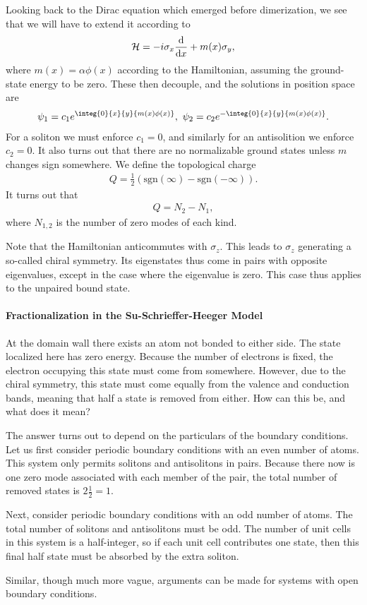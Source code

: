 Looking back to the Dirac equation which emerged before dimerization, we see that we will have to extend it according to
\begin{align*}
	\mathcal{H} = -i\sigma_{x}\dv{x} + m(x)\sigma_{y},
\end{align*}
where $m(x) = \alpha\phi(x)$ according to the Hamiltonian, assuming the ground-state energy to be zero. These then decouple, and the solutions in position space are
\begin{align*}
	\psi_{1} = c_{1}e^{\integ{0}{x}{y}{m(x)\phi(x)}},\ \psi_{2} = c_{2}e^{-\integ{0}{x}{y}{m(x)\phi(x)}}.
\end{align*}
For a soliton we must enforce $c_{1} = 0$, and similarly for an antisolition we enforce $c_{2} = 0$. It also turns out that there are no normalizable ground states unless $m$ changes sign somewhere. We define the topological charge
\begin{align*}
	Q = \frac{1}{2}\left(\text{sgn}(\infty) - \text{sgn}(-\infty)\right).
\end{align*}
It turns out that
\begin{align*}
	Q = N_{2} - N_{1},
\end{align*}
where $N_{1, 2}$ is the number of zero modes of each kind.

Note that the Hamiltonian anticommutes with $\sigma_{z}$. This leads to $\sigma_{z}$ generating a so-called chiral symmetry. Its eigenstates thus come in pairs with opposite eigenvalues, except in the case where the eigenvalue is zero. This case thus applies to the unpaired bound state.

\paragraph{Fractionalization in the Su-Schrieffer-Heeger Model}
At the domain wall there exists an atom not bonded to either side. The state localized here has zero energy. Because the number of electrons is fixed, the electron occupying this state must come from somewhere. However, due to the chiral symmetry, this state must come equally from the valence and conduction bands, meaning that half a state is removed from either. How can this be, and what does it mean?

The answer turns out to depend on the particulars of the boundary conditions. Let us first consider periodic boundary conditions with an even number of atoms. This system only permits solitons and antisolitons in pairs. Because there now is one zero mode associated with each member of the pair, the total number of removed states is $2\frac{1}{2} = 1$.

Next, consider periodic boundary conditions with an odd number of atoms. The total number of solitons and antisolitons must be odd. The number of unit cells in this system is a half-integer, so if each unit cell contributes one state, then this final half state must be absorbed by the extra soliton.

Similar, though much more vague, arguments can be made for systems with open boundary conditions.
